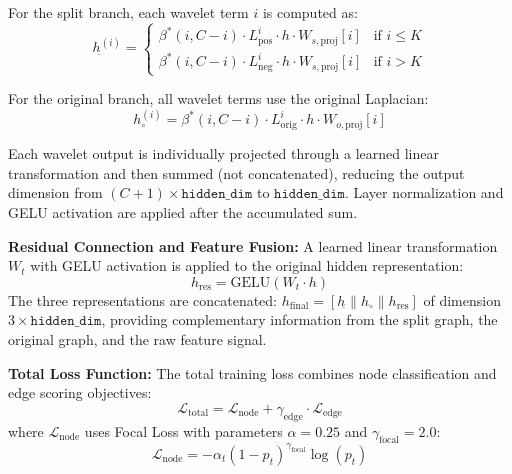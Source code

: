 For the split branch, each wavelet term $i$ is computed as:
\begin{equation}
h_{\hat{}}^{(i)} = \begin{cases}
\beta^*(i, C-i) \cdot L_{\text{pos}}^i \cdot h \cdot W_{s,\text{proj}}[i] & \text{if } i \leq K \\
\beta^*(i, C-i) \cdot L_{\text{neg}}^i \cdot h \cdot W_{s,\text{proj}}[i] & \text{if } i > K
\end{cases}
\label{eq:split-wavelet}
\end{equation}

For the original branch, all wavelet terms use the original Laplacian:
\begin{equation}
h_{\circ}^{(i)} = \beta^*(i, C-i) \cdot L_{\text{orig}}^i \cdot h \cdot W_{o,\text{proj}}[i]
\label{eq:orig-wavelet}
\end{equation}

Each wavelet output is individually projected through a learned linear transformation and then summed (not concatenated), reducing the output dimension from $(C+1) \times \texttt{hidden\_dim}$ to $\texttt{hidden\_dim}$. Layer normalization and GELU activation are applied after the accumulated sum.

\textbf{Residual Connection and Feature Fusion:} A learned linear transformation $W_t$ with GELU activation is applied to the original hidden representation:
\begin{equation}
h_{\text{res}} = \text{GELU}(W_t \cdot h)
\label{eq:residual}
\end{equation}
The three representations are concatenated: $h_{\text{final}} = [h_{\hat{}} \| h_{\circ} \| h_{\text{res}}]$ of dimension $3 \times \texttt{hidden\_dim}$, providing complementary information from the split graph, the original graph, and the raw feature signal.

\textbf{Total Loss Function:} The total training loss combines node classification and edge scoring objectives:
\begin{equation}
\mathcal{L}_{\text{total}} = \mathcal{L}_{\text{node}} + \gamma_{\text{edge}} \cdot \mathcal{L}_{\text{edge}}
\label{eq:total-loss}
\end{equation}
where $\mathcal{L}_{\text{node}}$ uses Focal Loss with parameters $\alpha = 0.25$ and $\gamma_{\text{focal}} = 2.0$:
\begin{equation}
\mathcal{L}_{\text{node}} = -\alpha_t (1 - p_t)^{\gamma_{\text{focal}}} \log(p_t)
\label{eq:focal-loss}
\end{equation}

